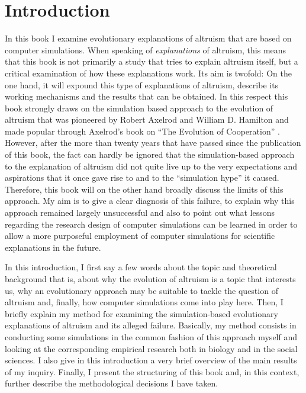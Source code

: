 

\chapter{Introduction}

\setcounter{page}{7}

In this book I examine evolutionary explanations of altruism that are based
on computer simulations. When speaking of {\em explanations} of
altruism, this means that this book is not primarily a study that tries to explain
altruism itself, but a critical examination of how these explanations work.
Its aim is twofold: On the one hand, it will expound this type of
explanations of altruism, describe its working mechanisms and the results that
can be obtained. In this respect this book strongly draws on the simulation
based approach to the evolution of altruism that was pioneered by Robert
Axelrod and William D. Hamilton \cite[]{axelrod-hamilton:1981} and made
popular through Axelrod's book on ``The Evolution of Cooperation''
\cite[]{axelrod:1984}. However, after the more than twenty years that have
passed since the publication of this book, the fact can hardly be ignored that
the simulation-based approach to the explanation of altruism did not quite
live up to the very expectations and aspirations that it once gave rise to and
to the ``simulation hype'' it caused. Therefore, this book will on the other
hand broadly discuss the limits of this approach. My aim is to give a
clear diagnosis of this failure, to explain why this approach remained largely
unsuccessful and also to point out what lessons regarding the research design of
computer simulations can be learned in order to allow a more purposeful employment of computer simulations for scientific explanations in the future.

In this introduction, I first say a few words about the topic and
theoretical background that is, about why the evolution of altruism is a topic
that interests us, why an evolutionary approach may be suitable to tackle the
question of altruism and, finally, how computer simulations come into play
here. Then, I briefly explain my method for examining the simulation-based evolutionary explanations of altruism and its alleged failure.
Basically, my method consists in conducting some simulations in the common
fashion of this approach myself and looking at the corresponding empirical
research both in biology and in the social sciences. I also give in this
introduction a very brief overview of the main results of my inquiry.
Finally, I present the structuring of this book and, in this context,
further describe the methodological decisions I have taken.

